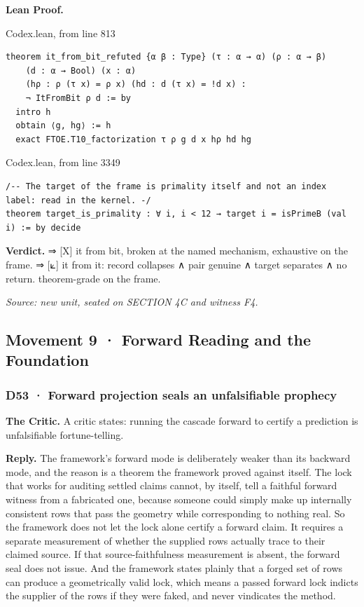 \documentclass[10pt,twocolumn]{article}
\begin{document}
\textbf{Lean Proof.}

\begin{leanexcerpt}{Codex.lean, from line 813}
\begin{lstlisting}[style=leanx,firstnumber=813]
theorem it_from_bit_refuted {α β : Type} (τ : α → α) (ρ : α → β)
    (d : α → Bool) (x : α)
    (hρ : ρ (τ x) = ρ x) (hd : d (τ x) = !d x) :
    ¬ ItFromBit ρ d := by
  intro h
  obtain ⟨g, hg⟩ := h
  exact FTOE.T10_factorization τ ρ g d x hρ hd hg
\end{lstlisting}
\end{leanexcerpt}

\begin{leanexcerpt}{Codex.lean, from line 3349}
\begin{lstlisting}[style=leanx,firstnumber=3349]
/-- The target of the frame is primality itself and not an index label: read in the kernel. -/
theorem target_is_primality : ∀ i, i < 12 → target i = isPrimeB (val i) := by decide
\end{lstlisting}
\end{leanexcerpt}

\textbf{Verdict.} ⇒ {[}X{]} it from bit, broken at the named mechanism,
exhaustive on the frame. ⇒ {[}⟀{]} it from it: record collapses ∧ pair
genuine ∧ target separates ∧ no return. theorem-grade on the frame.

\emph{Source: new unit, seated on SECTION 4C and witness F4.}

\hypertarget{movement-9-forward-reading-and-the-foundation}{%
\subsection{Movement 9 · Forward Reading and the
Foundation}\label{movement-9-forward-reading-and-the-foundation}}

\hypertarget{d53-forward-projection-seals-an-unfalsifiable-prophecy}{%
\subsubsection{D53 · Forward projection seals an unfalsifiable
prophecy}\label{d53-forward-projection-seals-an-unfalsifiable-prophecy}}

\textbf{The Critic.} A critic states: running the cascade forward to
certify a prediction is unfalsifiable fortune-telling.

\textbf{Reply.} The framework's forward mode is deliberately weaker than
its backward mode, and the reason is a theorem the framework proved
against itself. The lock that works for auditing settled claims cannot,
by itself, tell a faithful forward witness from a fabricated one,
because someone could simply make up internally consistent rows that
pass the geometry while corresponding to nothing real. So the framework
does not let the lock alone certify a forward claim. It requires a
separate measurement of whether the supplied rows actually trace to
their claimed source. If that source-faithfulness measurement is absent,
the forward seal does not issue. And the framework states plainly that a
forged set of rows can produce a geometrically valid lock, which means a
passed forward lock indicts the supplier of the rows if they were faked,
and never vindicates the method.
\end{document}
